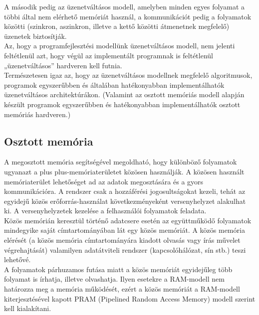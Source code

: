 \documentclass[tikz,12pt,margin=0px]{article}
\newcommand\lword[1]{\leavevmode\nobreak\hskip0pt plus\linewidth\penalty50\hskip0pt plus-\linewidth\nobreak #1}
\begin{document}
    \noindent A második pedig az üzenetváltásos modell, amelyben minden egyes folyamat a többi által nem elérhető memóriát használ, a kommunikációt pedig a folyamatok közötti (szinkron, aszinkron, illetve a kettő közötti átmenetnek  megfelelő)  üzenetek  biztosítják.\\

    \noindent Az, hogy a programfejlesztési modellünk üzenetváltásos modell, nem jelenti feltétlenül azt, hogy végül az implementált programnak is feltétlenül „üzenetváltásos” hardveren kell futnia.\\
    Természetesen igaz az, hogy az üzenetváltásos modellnek megfelelő algoritmusok, programok  egyszerűbben  és  általában  hatékonyabban  implementálhatók  üzenetváltásos architektúrákon.  (Valamint  az  osztott  memóriás  modell  alapján  készült  programok egyszerűbben és hatékonyabban implementálhatók osztott memóriás hardveren.)

	\subsection*{Osztott memória}

    A megosztott memória segítségével megoldható, hogy különböző folyamatok ugyanazt a \lword{memóriaterületet} közösen használják. A közösen használt memóriaterület lehetőséget ad az adatok megosztására és a gyors kommunikációra. A rendszer csak a hozzáférési jogosultságokat kezeli, tehát az egyidejű közös erőforrás-használat következményeként versenyhelyzet alakulhat ki. A versenyhelyzetek kezelése a felhasználói folyamatok feladata.\\

    \noindent Közös memórián keresztül történő adatcsere esetén az együttműködő folyamatok mindegyike saját címtartományában lát egy közös memóriát. A közös memória elérését (a közös memória címtartományára kiadott olvasás vagy írás művelet végrehajtását) valamilyen adatátviteli rendszer (kapcsolóhálózat, sín stb.) teszi lehetővé.\\

    \noindent A folyamatok párhuzamos futása miatt a közös memóriát egyidejűleg több folyamat is írhatja, illetve olvashatja. Ilyen esetekre a RAM-modell nem határozza meg a memória működését, ezért a közös memóriát a RAM-modell kiterjesztésével kapott PRAM (Pipelined Random Access Memory) modell szerint kell kialakítani.\\
\end{document}
